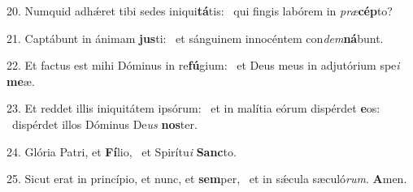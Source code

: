 20. Numquid adhǽret tibi sedes iniqui\textbf{tá}tis: \ast\  qui fingis labórem in \textit{præ}\textbf{cép}to?\

21. Captábunt in ánimam \textbf{jus}ti: \ast\  et sánguinem innocéntem con\textit{dem}\textbf{ná}bunt.\

22. Et factus est mihi Dóminus in re\textbf{fú}gium: \ast\  et Deus meus in adjutórium spe\textit{i} \textbf{me}æ.\

23. Et reddet illis iniquitátem ipsórum: \dag\  et in malítia eórum dispérdet \textbf{e}os: \ast\  dispérdet illos Dóminus De\textit{us} \textbf{nos}ter.\

24. Glória Patri, et \textbf{Fí}lio, \ast\  et Spirítu\textit{i} \textbf{Sanc}to.\

25. Sicut erat in princípio, et nunc, et \textbf{sem}per, \ast\  et in sǽcula sæculó\textit{rum}. \textbf{A}men.\


